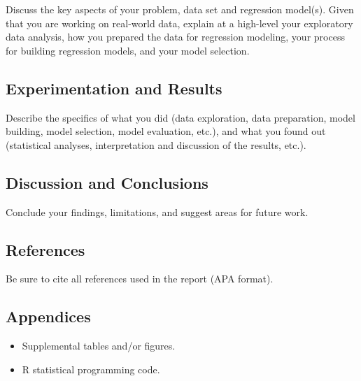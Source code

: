 \documentclass[12pt]{article}
\providecommand{\tightlist}{%
  \setlength{\itemsep}{0pt}\setlength{\parskip}{0pt}}
\begin{document}
Discuss the key aspects of your problem, data set and regression
model(s). Given that you are working on real-world data, explain at a
high-level your exploratory data analysis, how you prepared the data for
regression modeling, your process for building regression models, and
your model selection.

\hypertarget{experimentation-and-results}{%
\subsection{Experimentation and
Results}\label{experimentation-and-results}}

Describe the specifics of what you did (data exploration, data
preparation, model building, model selection, model evaluation, etc.),
and what you found out (statistical analyses, interpretation and
discussion of the results, etc.).

\hypertarget{discussion-and-conclusions}{%
\subsection{Discussion and
Conclusions}\label{discussion-and-conclusions}}

Conclude your findings, limitations, and suggest areas for future work.

\hypertarget{references}{%
\subsection{References}\label{references}}

Be sure to cite all references used in the report (APA format).

\hypertarget{appendices}{%
\subsection{Appendices}\label{appendices}}

\begin{itemize}
\tightlist
\item
  Supplemental tables and/or figures.
\item
  R statistical programming code.
\end{itemize}



\end{document}
